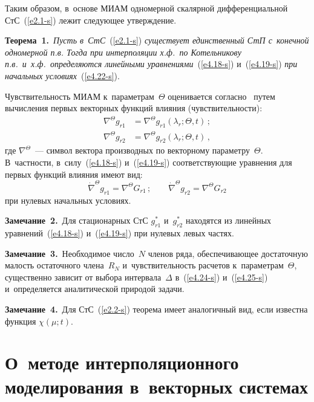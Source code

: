 \begin{multicols}{2}
Таким образом, в~основе МИАМ одномерной скалярной дифференциальной СтС~(\ref{e2.1-s}) 
лежит следующее утверждение.

\smallskip

\noindent
\textbf{Теорема~1.}\
\textit{Пусть в~СтС}~(\ref{e2.1-s}) \textit{существует единственный СтП с~конечной 
одномерной п.в. Тогда при интерполяции х.ф.\ по Котельникову п.в.\ и~х.ф.\
 определяются линейными уравнениями}~(\ref{e4.18-s}) и~(\ref{e4.19-s}) 
 \textit{при начальных условиях}~(\ref{e4.22-s}).

\smallskip

Чувствительность МИАМ к~параметрам~$\Theta$ оценивается согласно~\cite{7-s} 
путем вычисления первых векторных функций влияния (чувствительности):
       \begin{align*}
       \nabla^\Theta g_{r1} &= \nabla^\Theta g_{r1} \left( \lambda_r; \Theta, t\right)
        \,;\\ 
    \nabla^\Theta g_{r2} &= \nabla^\Theta g_{r2} \left(\lambda_r;\Theta, t\right)\,,
    \end{align*}
где $\nabla^\Theta$~--- символ вектора производных по векторному параметру~$\Theta$. 
В~частности, в~силу~(\ref{e4.18-s}) и~(\ref{e4.19-s}) 
соответствующие уравнения для первых функций влияния имеют вид:
    \begin{equation*}
    \dot \nabla^\Theta g_{r1} = \nabla^\Theta G_{r1}\,; \qquad
    \dot \nabla^\Theta g_{r2} = \nabla^\Theta G_{r2}
    \end{equation*}
при нулевых начальных условиях.

\smallskip

\noindent
\textbf{Замечание~2.}\
Для стационарных СтС $g_{r1}^*$ и~$g_{r2}^*$ находятся из линейных 
уравнений~(\ref{e4.18-s}) и~(\ref{e4.19-s}) при нулевых левых частях.

\smallskip

\noindent
\textbf{Замечание~3.}\
Необходимое число~$N$ членов ряда, обеспечивающее достаточную малость 
остаточного члена~$R_N$ и~чувствительность расчетов к~па\-ра\-мет\-рам~$\Theta$, 
существенно зависит от выбора интервала~$\Delta$ в~(\ref{e4.24-s}) 
и~(\ref{e4.25-s}) и~определяется  аналитической природой задачи.

\smallskip

\noindent
\textbf{Замечание~4.}\
Для СтС~(\ref{e2.2-s}) теорема имеет аналогичный вид, если известна функция $\chi(\mu;t)$.

\section{О~методе интерполяционного моделирования в~векторных системах}


\end{multicols}
